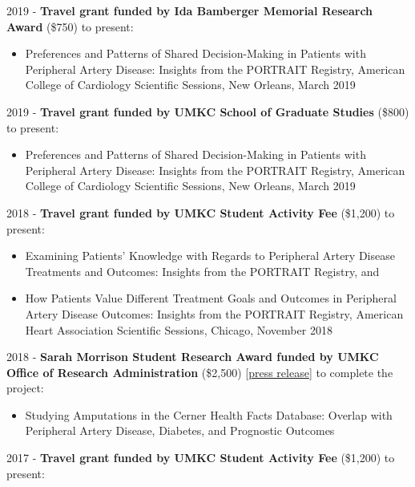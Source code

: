 \documentclass[
]{article}
\providecommand{\tightlist}{%
  \setlength{\itemsep}{0pt}\setlength{\parskip}{0pt}}
\begin{document}
2019 - \textbf{Travel grant funded by Ida Bamberger Memorial Research
Award} (\$750) to present:

\begin{itemize}
\tightlist
\item
  Preferences and Patterns of Shared Decision-Making in Patients with
  Peripheral Artery Disease: Insights from the PORTRAIT Registry,
  American College of Cardiology Scientific Sessions, New Orleans, March
  2019
\end{itemize}

2019 - \textbf{Travel grant funded by UMKC School of Graduate Studies}
(\$800) to present:

\begin{itemize}
\tightlist
\item
  Preferences and Patterns of Shared Decision-Making in Patients with
  Peripheral Artery Disease: Insights from the PORTRAIT Registry,
  American College of Cardiology Scientific Sessions, New Orleans, March
  2019
\end{itemize}

2018 - \textbf{Travel grant funded by UMKC Student Activity Fee}
(\$1,200) to present:

\begin{itemize}
\tightlist
\item
  Examining Patients' Knowledge with Regards to Peripheral Artery
  Disease Treatments and Outcomes: Insights from the PORTRAIT Registry,
  and
\item
  How Patients Value Different Treatment Goals and Outcomes in
  Peripheral Artery Disease Outcomes: Insights from the PORTRAIT
  Registry, American Heart Association Scientific Sessions, Chicago,
  November 2018
\end{itemize}

2018 - \textbf{Sarah Morrison Student Research Award funded by UMKC
Office of Research Administration} (\$2,500)
{[}\href{https://med.umkc.edu/tag/sarah-morrison-student-research-award/}{press
release}{]} to complete the project:

\begin{itemize}
\tightlist
\item
  Studying Amputations in the Cerner Health Facts Database: Overlap with
  Peripheral Artery Disease, Diabetes, and Prognostic Outcomes
\end{itemize}

2017 - \textbf{Travel grant funded by UMKC Student Activity Fee}
(\$1,200) to present:
\end{document}

